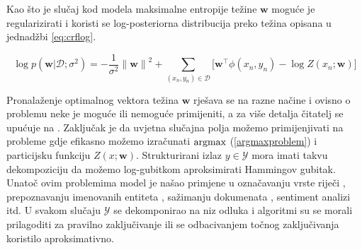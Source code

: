 Kao što je slučaj kod modela maksimalne entropije težine $\mathbf{w}$ moguće je
regularizirati i koristi se log-posteriorna distribucija preko težina opisana u
jednadžbi \ref{eq:crflog}.

\begin{equation}\label{eq:crflog}
  \log p(\mathbf{w} | \mathcal{D}; \sigma^2) = -\frac{1}{\sigma^2} {\lVert\mathbf{w}\lVert}^2 + \sum_{(x_n, y_n) \in \mathcal{D}} \bigg[ \mathbf{w}^\top \phi(x_n, y_n) - \log Z(x_n; \mathbf{w}) \bigg]
\end{equation}

Pronalaženje optimalnog vektora težina $\mathbf{w}$ rješava se na razne načine
\citep{lafferty2001conditional, sha2003shallow, sokolovska2010efficient} i
ovisno o problemu neke je moguće ili nemoguće primijeniti, a za više detalja
čitatelj se upućuje na \citep{wallach2004conditional, sutton2006introduction}.
Zaključak je da uvjetna slučajna polja možemo primijenjivati na probleme gdje
efikasno možemo izračunati $\operatorname*{argmax}$ (\ref{argmaxproblem}) i particijsku
funkciju $Z(x; \mathbf{w})$. Strukturirani izlaz $y \in \mathcal{Y}$ mora imati
takvu dekompoziciju da možemo log-gubitkom aproksimirati Hammingov gubitak.
Unatoč ovim problemima model je našao primjene u označavanju vrste riječi
\citep{lafferty2001conditional}, prepoznavanju imenovanih entiteta
\citep{mccallum2003early, settles2004biomedical}, sažimanju dokumenata
 \citep{shen2007document}, sentiment analizi
\citep{mcdonald2007structured} itd. U svakom slučaju $\mathcal{Y}$ se
dekomponirao na niz odluka i algoritmi su se morali prilagoditi za pravilno
zaključivanje ili se odbacivanjem točnog zaključivanja koristilo aproksimativno.
